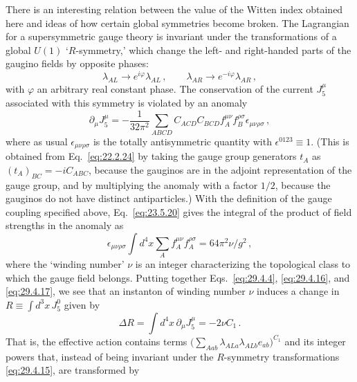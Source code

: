 There is an interesting relation between the value of the Witten index
obtained here and ideas of how certain global symmetries become broken.
The Lagrangian for a supersymmetric gauge theory is invariant under the
transformations of a global \(U(1)\) `\(R\)-symmetry,' which change the
left- and right-handed parts of the gaugino fields by opposite phases:
\begin{equation}
  \lambda_{AL}\longrightarrow e^{i\varphi}\lambda_{AL}\,,
  \qquad
  \lambda_{AR}\longrightarrow e^{-i\varphi}\lambda_{AR}\,,
  \tag{29.4.15}\label{eq:29.4.15}
\end{equation}
with \(\varphi\) an arbitrary real constant phase. The conservation of the
current \(J_5^\mu\) associated with this symmetry is violated by an anomaly
\begin{equation}
  \partial_\mu J_5^\mu
  =
  -\frac{1}{32\pi^2}
  \sum_{ABCD}
  C_{ACD}C_{BCD}
  f_A^{\mu\nu}f_B^{\rho\sigma}
  \epsilon_{\mu\nu\rho\sigma}\,,
  \tag{29.4.16}\label{eq:29.4.16}
\end{equation}
where as usual \(\epsilon_{\mu\nu\rho\sigma}\) is the totally
antisymmetric quantity with \(\epsilon^{0123}\equiv1\). (This is obtained
from Eq.~\eqref{eq:22.2.24} by taking the gauge group generators \(t_A\) as
\((t_A)_{BC}=-iC_{ABC}\), because the gauginos are in the adjoint
representation of the gauge group, and by multiplying the anomaly with a
factor \(1/2\), because the gauginos do not have distinct antiparticles.)
With the definition of the gauge coupling specified above,
Eq.~\eqref{eq:23.5.20} gives the integral of the product of field strengths
in the anomaly as
\begin{equation}
  \epsilon_{\mu\nu\rho\sigma}
  \int d^4x\sum_A f_A^{\mu\nu}f_A^{\rho\sigma}
  =64\pi^2\nu/g^2\,,
  \tag{29.4.17}\label{eq:29.4.17}
\end{equation}
where the `winding number' \(\nu\) is an integer characterizing the
topological class to which the gauge field belongs. Putting together
Eqs.~\eqref{eq:29.4.4}, \eqref{eq:29.4.16}, and \eqref{eq:29.4.17}, we
see that an instanton of winding number \(\nu\) induces a change in
\(R\equiv\int d^3x\,J_5^0\) given by
\begin{equation}
  \Delta R
  =
  \int d^4x\,\partial_\mu J_5^\mu
  =-2\nu C_1\,.
  \tag{29.4.18}\label{eq:29.4.18}
\end{equation}
That is, the effective action contains terms
\(\bigl(\sum_{Aab}\lambda_{ALa}\lambda_{ALb}e_{ab}\bigr)^{C_1}\) and
its integer powers that, instead of being invariant under the
\(R\)-symmetry transformations \eqref{eq:29.4.15}, are transformed by
